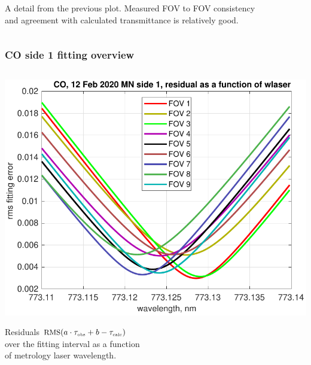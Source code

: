 \documentclass[9pt]{beamer}
\begin{document}
\begin{frame}
\begin{columns}[t]
\begin{column}{0.5\textwidth}
A detail from the previous plot.  Measured FOV to FOV consistency \\
and agreement with calculated transmittance is relatively good.

\end{column}
\end{columns}
\end{frame}
\begin{frame}
\frametitle{CO side 1 fitting overview}
\begin{columns}[t]
\begin{column}{0.5\textwidth}
  \begin{centering}
  \includegraphics[width=\textwidth]{02-12_mn_s1_CO/CO_wlaser_fit.pdf}
  \end{centering}\vspace{3mm}

Residuals $\mbox{\small RMS}(a\cdot\tau_{\mbox{\tiny obs}} + b - \tau_{\mbox{\tiny calc}})$ \\ over the fitting
interval as a function \\ of metrology laser wavelength.


\end{column}
\end{columns}
\end{frame}
\end{document}
